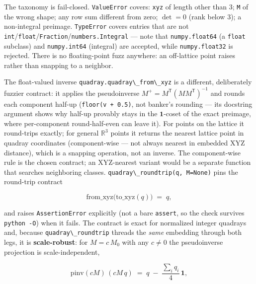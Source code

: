 \documentclass[
  10pt,
]{article}
\newcommand{\passthrough}[1]{#1}
\begin{document}
The taxonomy is fail-closed. \passthrough{\lstinline!ValueError!}
covers: \passthrough{\lstinline!xyz!} of length other than 3;
\passthrough{\lstinline!M!} of the wrong shape; any row sum different
from zero; \(\det = 0\) (rank below 3); a non-integral preimage.
\passthrough{\lstinline!TypeError!} covers entries that are not
\passthrough{\lstinline!int!}/\passthrough{\lstinline!float!}/\passthrough{\lstinline!Fraction!}/\passthrough{\lstinline!numbers.Integral!}
--- note that \passthrough{\lstinline!numpy.float64!} (a
\passthrough{\lstinline!float!} subclass) and
\passthrough{\lstinline!numpy.int64!} (integral) are accepted, while
\passthrough{\lstinline!numpy.float32!} is rejected. There is no
floating-point fuzz anywhere: an off-lattice point raises rather than
snapping to a neighbor.

The float-valued inverse
\passthrough{\lstinline!quadray.quadray\_from\_xyz!} is a different,
deliberately fuzzier contract: it applies the pseudoinverse
\(M^{+} = M^{\mathsf{T}}(MM^{\mathsf{T}})^{-1}\) and rounds each
component half-up (\passthrough{\lstinline!floor(v + 0.5)!}, not
banker's rounding --- its docstring argument shows why half-up provably
stays in the \(\mathbf{1}\)-coset of the exact preimage, where
per-component round-half-even can leave it). For points on the lattice
it round-trips exactly; for general \(\mathbb{R}^3\) points it returns
the nearest lattice point in quadray coordinates (component-wise --- not
always nearest in embedded XYZ distance), which is a snapping operation,
not an inverse. The component-wise rule is the chosen contract; an
XYZ-nearest variant would be a separate function that searches
neighboring classes.
\passthrough{\lstinline!quadray\_roundtrip(q, M=None)!} pins the
round-trip contract

\begin{equation}
\label{eq:conv-roundtrip}
\mathrm{from\_xyz}\bigl(\mathrm{to\_xyz}(q)\bigr) \;=\; q ,
\end{equation}

and raises \passthrough{\lstinline!AssertionError!} explicitly (not a
bare \passthrough{\lstinline!assert!}, so the check survives
\passthrough{\lstinline!python -O!}) when it fails. The contract is
exact for normalized integer quadrays and, because
\passthrough{\lstinline!quadray\_roundtrip!} threads the \emph{same}
embedding through both legs, it is \textbf{scale-robust}: for
\(M = c\,M_0\) with any \(c \neq 0\) the pseudoinverse projection is
scale-independent,

\begin{equation}
\label{eq:conv-roundtrip-scale}
\mathrm{pinv}(cM)\,(cM\,q) \;=\; q \;-\; \frac{\sum_i q_i}{4}\,\mathbf{1},
\end{equation}
\end{document}
